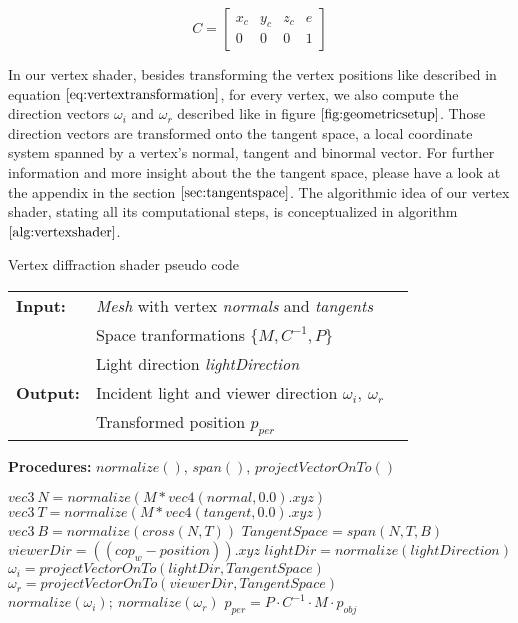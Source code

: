 \begin{equation}
  C = \begin{bmatrix} x_c & y_c & z_c & e \\ 0 & 0 & 0 & 1 \end{bmatrix}
  \label{eq:cameramatrixeq}
\end{equation}

In our vertex shader, besides transforming the vertex positions like described in equation $\ref{eq:vertextransformation}$, for every vertex, we also compute the direction vectors $\omega_i$ and $\omega_r$ described like in figure $\ref{fig:geometricsetup}$. Those direction vectors are transformed onto the tangent space, a local coordinate system spanned by a vertex's normal, tangent and binormal vector. For further information and more insight about the the tangent space, please have a look at the appendix in the section $\ref{sec:tangentspace}$. The algorithmic idea of our vertex shader, stating all its computational steps, is conceptualized in algorithm $\ref{alg:vertexshader}$.

\begin{algorithm}[H]
\caption{Vertex diffraction shader pseudo code}
\begin{table}[H]
  \begin{tabular}{@{}lll@{}}
    \textbf{Input:} & \emph{Mesh} with vertex \emph{normals} and \emph{tangents}  \\
    & Space tranformations $\{M, C^{-1}, P\}$  \\
    & Light direction \emph{lightDirection}  \\
    \textbf{Output:} & Incident light and viewer direction $\omega_i,\ \omega_r$ \\
    & Transformed position $p_{per}$ \\
  \end{tabular} 
\end{table}
\textbf{Procedures:} $normalize()$, $span()$, $projectVectorOnTo()$  \\
\setlength{\fboxrule}{0pt} 
\begin{boxedminipage}{1.0\textwidth}
  \begin{algorithmic}[1]
        \State $ vec3 \ N = normalize(M * vec4(normal,0.0).xyz)$
        \State $ vec3 \ T = normalize(M * vec4(tangent,0.0).xyz)$
        \State $ vec3 \ B = normalize(cross(N, T))$
        \State $ TangentSpace = span(N, T, B)$
        \State $ viewerDir = ((cop_{w}-position)).xyz$
        \State $ lightDir = normalize(lightDirection)$
        \State $ \omega_i = projectVectorOnTo(lightDir, TangentSpace)$
        \State $ \omega_r = projectVectorOnTo(viewerDir, TangentSpace)$
        \State $normalize(\omega_i); \ normalize(\omega_r)$
        \State $p_{per} = P \cdot C^{-1} \cdot M \cdot p_{obj}$
      \EndFor
  \end{algorithmic}
  \end{boxedminipage}
  \vskip1.5pt
\label{alg:vertexshader}
\end{algorithm}

